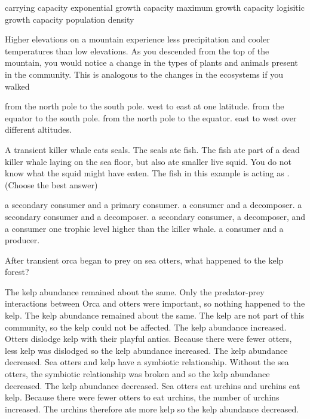\begin{choices}
\correctchoice carrying capacity
\choice exponential growth capacity
\choice maximum growth capacity
\choice logisitic growth capacity
\choice population density
\end{choices}

\question
Higher elevations on a mountain experience less precipitation and cooler temperatures than low elevations.  As you descended from the top of the mountain, you would notice a change in the types of plants and animals present in the community.  This is analogous to the changes in the ecosystems if you walked 

\begin{choices}
\choice from the north pole to the south pole.
\choice west to east at one latitude.
\choice from the equator to the south pole.
\correctchoice from the north pole to the equator.
\choice east to west over different altitudes.
\end{choices}

\question
A transient killer whale eats seals. The seals ate fish. The fish ate part of a dead killer whale laying on the sea floor, but also ate smaller live squid. You do not know what the squid might have eaten. The fish in this example is acting as \underline{\hspace{2cm}}. (Choose the best answer)

\begin{choices}
\choice a secondary consumer and a primary consumer.
\correctchoice a consumer and a decomposer.
\choice a secondary consumer and a decomposer.
\choice a secondary consumer, a decomposer, and a consumer one trophic level higher than the killer whale.
\choice a consumer and a producer.
\end{choices}
%
\newpage
\question
After transient orca began to prey on sea otters, what happened to the kelp forest?

\begin{choices}
\choice The kelp abundance remained about the same. Only the predator-prey interactions between Orca and otters were important, so nothing happened to the kelp.
\choice The kelp abundance remained about the same. The kelp are not part of this community, so the kelp could not be affected.
\choice The kelp abundance increased. Otters dislodge kelp with their playful antics.  Because there were fewer otters, less kelp was dislodged so the kelp abundance increased.
\choice The kelp abundance decreased. Sea otters and kelp have a symbiotic relationship. Without the sea otters, the symbiotic relationship was broken and so the kelp abundance decreased.
\correctchoice The kelp abundance decreased. Sea otters eat urchins and urchins eat kelp.  Because there were fewer otters to eat urchins, the number of urchins increased.  The urchins therefore ate more kelp so the kelp abundance decreased.
\end{choices}

